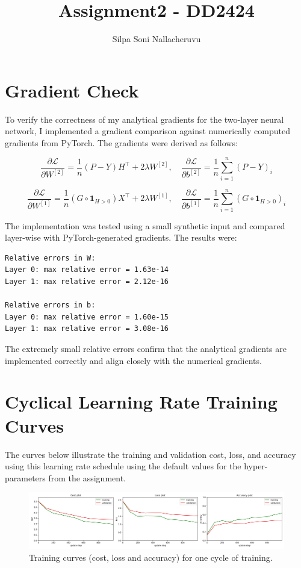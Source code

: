 \documentclass[11pt]{article}
\begin{document}
\title{Assignment2 - DD2424}
\author{Silpa Soni Nallacheruvu}
\date{}
\maketitle

\section*{Gradient Check}

To verify the correctness of my analytical gradients for the two-layer neural network, I implemented a gradient comparison against numerically computed gradients from PyTorch. The gradients were derived as follows:

\[
\frac{\partial \mathcal{L}}{\partial W^{[2]}} = \frac{1}{n} (P - Y) H^\top + 2\lambda W^{[2]}, \quad 
\frac{\partial \mathcal{L}}{\partial b^{[2]}} = \frac{1}{n} \sum_{i=1}^{n} (P - Y)_i
\]

\[
\frac{\partial \mathcal{L}}{\partial W^{[1]}} = \frac{1}{n} (G \circ \mathbf{1}_{H > 0}) X^\top + 2\lambda W^{[1]}, \quad 
\frac{\partial \mathcal{L}}{\partial b^{[1]}} = \frac{1}{n} \sum_{i=1}^{n} (G \circ \mathbf{1}_{H > 0})_i
\]

The implementation was tested using a small synthetic input and compared layer-wise with PyTorch-generated gradients. The results were:

\begin{lstlisting}[caption={Relative error of analytical and numerical gradients}, label={lst:gradients}]
Relative errors in W:
Layer 0: max relative error = 1.63e-14
Layer 1: max relative error = 2.12e-16

Relative errors in b:
Layer 0: max relative error = 1.60e-15
Layer 1: max relative error = 3.08e-16
\end{lstlisting}

The extremely small relative errors confirm that the analytical gradients are implemented correctly and align closely with the numerical gradients. 
\section*{Cyclical Learning Rate Training Curves}

The curves below illustrate the training and validation cost, loss, and accuracy using this learning rate schedule using the default values for the hyper-parameters from the assignment.

\begin{figure}[H]
    \centering
    \includegraphics[width=1\textwidth]{cyclic_training_curves_ex3.jpg}
    \caption{Training curves (cost, loss and accuracy) for one cycle of training.}
    \label{fig:cyclical_lr_curves1}
\end{figure}
\end{document}
